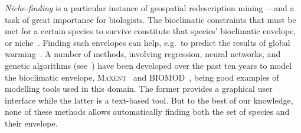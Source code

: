 \emph{Niche-finding} is a particular instance of geospatial redescription
mining ---and a task of great importance for biologists.  The
bioclimatic constraints that must be met for a certain species to
survive constitute that species' bioclimatic envelope, or
niche~\cite{grinnell17niche}.  Finding such envelopes can help, e.g.\
to predict the results of global warming~\cite{pearson03predicting}.
A number of methods, involving regression, neural networks, and
genetic algorithms (see~\cite{soberon05interpretation}) have been
developed over the past ten years to model the bioclimatic envelope,
\textsc{Maxent}~\cite{phillips2006maximum} and \textsc{BIOMOD}~\cite{thuiller09biomod}, being good examples of 
modelling tools used in this domain. The former provides a graphical user interface while the latter is a text-based tool.  But to the best of our knowledge,
none of these methods allows automatically finding both the set of
species and their envelope.

